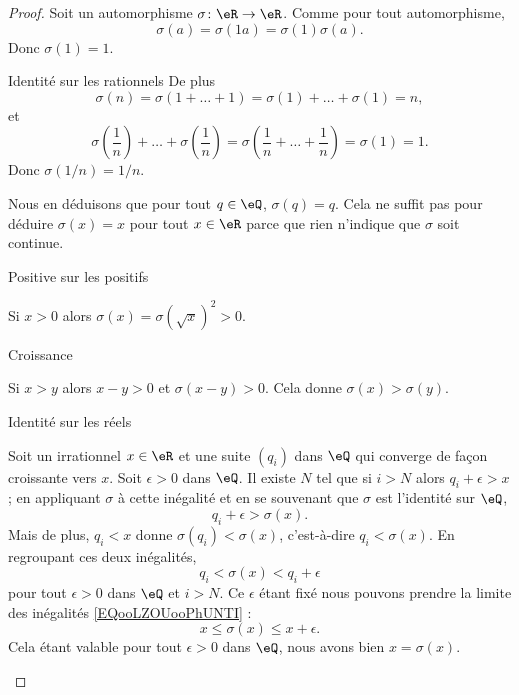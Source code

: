\begin{proof}
	Soit un automorphisme \( \sigma\colon \eR\to \eR\). Comme pour tout automorphisme,
	\begin{equation}
		\sigma(a)=\sigma(1a)=\sigma(1)\sigma(a).
	\end{equation}
	Donc \( \sigma(1)=1\).

	\begin{subproof}
		\item[Identité sur les rationnels]
		De plus
		\begin{equation}
			\sigma(n)=\sigma(1+\ldots +1)=\sigma(1)+\ldots +\sigma(1)=n,
		\end{equation}
		et
		\begin{equation}
			\sigma\left( \frac{1}{ n } \right)+\ldots +\sigma\left( \frac{1}{ n } \right)=\sigma\left( \frac{1}{ n }+\ldots +\frac{1}{ n } \right)=\sigma(1)=1.
		\end{equation}
		Donc \( \sigma(1/n)=1/n\).

		Nous en déduisons que pour tout \( q\in \eQ\), \( \sigma(q)=q\). Cela ne suffit pas pour déduire \( \sigma(x)=x\) pour tout \( x\in \eR\) parce que rien n'indique que \( \sigma\) soit continue.
		\item[Positive sur les positifs]

		Si \( x>0\) alors \( \sigma(x)=\sigma(\sqrt{ x })^2>0\).

		\item[Croissance]

		Si \( x>y\) alors \( x-y>0\) et \( \sigma(x-y)>0\). Cela donne \( \sigma(x)>\sigma(y)\).

		\item[Identité sur les réels]

		Soit un irrationnel \( x\in \eR\) et une suite \( (q_i)\) dans \( \eQ\) qui converge de façon croissante vers \( x\). Soit \( \epsilon>0\) dans \( \eQ\). Il existe \( N\) tel que si \( i>N\) alors \( q_i+\epsilon>x\); en appliquant \( \sigma\) à cette inégalité et en se souvenant que \( \sigma\) est l'identité sur \( \eQ\),
		\begin{equation}
			q_i+\epsilon>\sigma(x).
		\end{equation}
		Mais de plus, \( q_i<x\) donne \( \sigma(q_i)<\sigma(x)\), c'est-à-dire \( q_i<\sigma(x)\). En regroupant ces deux inégalités,
		\begin{equation}        \label{EQooLZOUooPhUNTI}
			q_i<\sigma(x)<q_i+\epsilon
		\end{equation}
		pour tout \( \epsilon>0\) dans \( \eQ\) et \( i>N\). Ce \( \epsilon\) étant fixé nous pouvons prendre la limite des inégalités \eqref{EQooLZOUooPhUNTI} :
		\begin{equation}
			x\leq \sigma(x)\leq x+\epsilon.
		\end{equation}
		Cela étant valable pour tout \( \epsilon>0\) dans \( \eQ\), nous avons bien \( x=\sigma(x)\).
	\end{subproof}
\end{proof}

